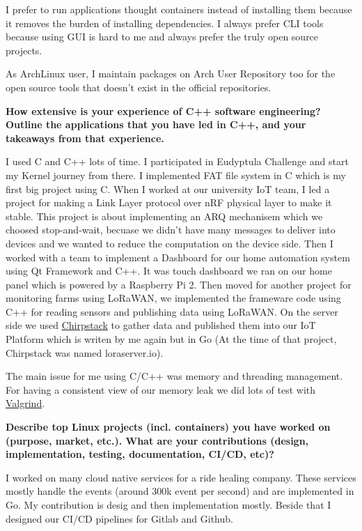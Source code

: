 I prefer to run applications thought containers instead of installing them because it removes the burden of installing
dependencies. I always prefer CLI tools because using GUI is hard to me and always prefer the truly open source projects.

As ArchLinux user, I maintain packages on Arch User Repository too for the open source tools that doesn't exist
in the official repositories.

\noindent
\textbf{How extensive is your experience of C++ software engineering? Outline the applications that you have led in C++,
and your takeaways from that experience.}

I used C and C++ lots of time.
I participated in Eudyptula Challenge and start my Kernel journey from there.
I implemented FAT file system in C which is my first big project using C. When I worked
at our university IoT team, I led a project for making a Link Layer protocol over nRF physical layer to make it stable.
This project is about implementing an ARQ mechanisem which we choosed stop-and-wait, becuase we didn't have many messages
to deliver into devices and we wanted to reduce the computation on the device side.
Then I worked with a team to implement a Dashboard for our home automation system using Qt Framework and C++. It was
touch dashboard we ran on our home panel which is powered by a Raspberry Pi 2.
Then moved for another project for monitoring farms using LoRaWAN, we implemented the frameware code using C++ for reading
sensors and publishing data using LoRaWAN. On the server side we used \href{https://www.chirpstack.io/}{Chirpstack}
to gather data and published them into our IoT Platform which is writen by me again but in Go
(At the time of that project, Chirpstack was named loraserver.io).

The main issue for me using C/C++ was memory and threading management.
For having a consistent view of our memory leak we did lots of test with \href{https://valgrind.org/}{Valgrind}.

\noindent
\textbf{Describe top Linux projects (incl. containers) you have worked on (purpose, market, etc.).
What are your contributions (design, implementation, testing, documentation, CI/CD, etc)?}

I worked on many cloud native services for a ride healing company. These services mostly handle the events (around
300k event per second) and are implemented in Go. My contribution is desig and then implementation mostly. Beside that
I designed our CI/CD pipelines for Gitlab and Github.

